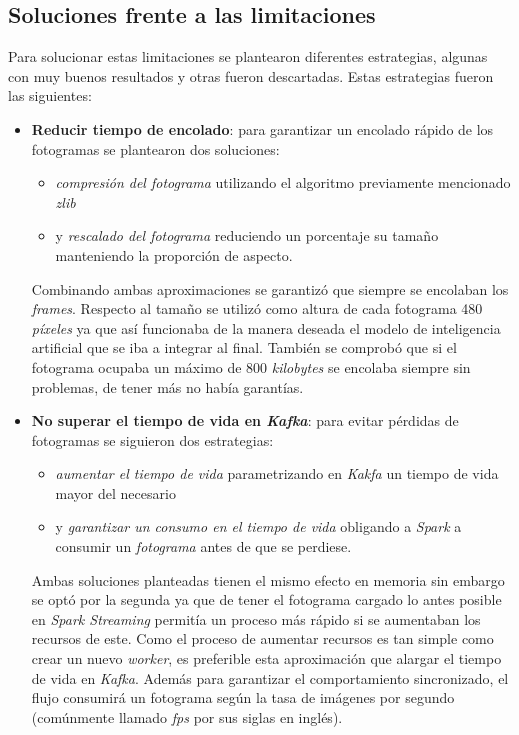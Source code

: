 \subsection{Soluciones frente a las limitaciones}

Para solucionar estas limitaciones se plantearon diferentes estrategias, algunas con muy buenos resultados y otras fueron descartadas. Estas estrategias fueron las siguientes:

\begin{itemize}
	\item \textbf{Reducir tiempo de encolado}: para garantizar un encolado rápido de los fotogramas se plantearon dos soluciones:
	\begin{itemize}
		\item \textit{compresión del fotograma} utilizando el algoritmo previamente mencionado \textit{zlib}~\cite{tool:zlib}
		\item y \textit{rescalado del fotograma} reduciendo un porcentaje su tamaño manteniendo la proporción de aspecto.
	\end{itemize}
	Combinando ambas aproximaciones se garantizó que siempre se encolaban los \textit{frames}. Respecto al tamaño se utilizó como altura de cada fotograma 480 \textit{píxeles} ya que así funcionaba de la manera deseada
	el modelo de inteligencia artificial que se iba a integrar al final. También se comprobó que si el fotograma ocupaba un máximo de 800 \textit{kilobytes} se encolaba siempre sin problemas, de tener más no había garantías.
	\item \textbf{No superar el tiempo de vida en \textit{Kafka}}: para evitar pérdidas de fotogramas se siguieron dos estrategias:
	\begin{itemize}
		\item \textit{aumentar el tiempo de vida} parametrizando en \textit{Kakfa} un tiempo de vida mayor del necesario
		\item y \textit{garantizar un consumo en el tiempo de vida} obligando a \textit{Spark} a consumir un \textit{fotograma} antes de que se perdiese.
	\end{itemize}
	Ambas soluciones planteadas tienen el mismo efecto en memoria sin embargo se optó por la segunda ya que de tener el fotograma cargado lo antes posible en \textit{Spark Streaming} permitía un proceso más rápido si se aumentaban los recursos de este. Como el proceso de aumentar recursos es tan simple como crear un nuevo \textit{worker}, es preferible esta aproximación que alargar el tiempo de vida en \textit{Kafka}. Además para garantizar el comportamiento sincronizado, el flujo consumirá un fotograma según la tasa de imágenes por segundo (comúnmente llamado \textit{fps} por sus siglas en inglés).

\end{itemize}

